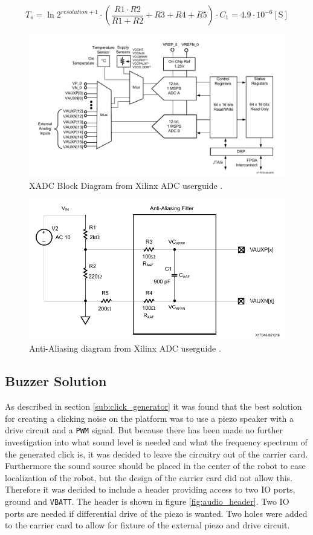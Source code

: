 \begin{equation}
	\label{eq:aliasing}
	T_{s}=\ln{2^{resolution+1}}\cdot \left(\frac{R1\cdot R2}{R1 + R2}+R3+R4+R5\right)\cdot C_1 = 4.9\cdot 10^{-6}[\text{S}]
\end{equation}

\begin{figure}[h]
	\centering
	\includegraphics[width=1\linewidth]{graphics/adc.pdf}
	\caption{XADC Block Diagram from Xilinx ADC userguide \cite{adc}.}
	\label{fig:adc}
\end{figure}

\begin{figure}[h]
	\centering
	\includegraphics[width=0.8\linewidth]{graphics/anti_aliasing.pdf}
	\caption{Anti-Aliasing diagram from Xilinx ADC userguide \cite{adc}.}
	\label{fig:anti_a}
\end{figure}
\subsection{Buzzer Solution}	
As described in section \ref{sub:click_generator} it was found that the best solution for creating a clicking noise on the platform was to use a piezo speaker with a drive circuit and a \texttt{PWM} signal.
But because there has been made no further investigation into what sound level is needed and what the frequency spectrum of the generated click is, it was decided to leave the circuitry out of the carrier card.
Furthermore the sound source should be placed in the center of the robot to ease localization of the robot, but the design of the carrier card did not allow this.
Therefore it was decided to include a header providing access to two IO ports, ground and \texttt{VBATT}.
The header is shown in figure \ref{fig:audio_header}.
Two IO ports are needed if differential drive of the piezo is wanted.
Two holes were added to the carrier card to allow for fixture of the external piezo and drive circuit.

